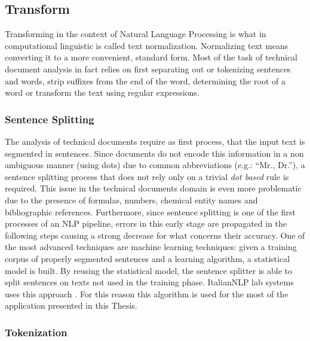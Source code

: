 \documentclass[]{book}
\begin{document}
\subsection{Transform}\label{sotatoolstransform}

Transforming in the context of Natural Language Processing is what in
computational linguistic is called text normalization. Normalizing text
means converting it to a more convenient, standard form. Most of the
task of technical document analysis in fact relies on first separating
out or tokenizing sentences and words, strip suffixes from the end of
the word, determining the root of a word or transform the text using
regular expressions.

\subsubsection{Sentence Splitting}\label{sentence-splitting}

The analysis of technical documents require as first process, that the
input text is segmented in sentences. Since documents do not encode this
information in a non ambiguous manner (using dots) due to common
abbreviations (e.g.: ``Mr., Dr.''), a sentence splitting process that
does not rely only on a trivial \emph{dot based} rule is required. This
issue in the technical documents domain is even more problematic due to
the presence of formulas, numbers, chemical entity names and
bibliographic references. Furthermore, since sentence splitting is one
of the first processes of an NLP pipeline, errors in this early stage
are propagated in the following steps causing a strong decrease for what
concerns their accuracy. One of the most advanced techniques are machine
learning techniques: given a training corpus of properly segmented
sentences and a learning algorithm, a statistical model is built. By
reusing the statistical model, the sentence splitter is able to split
sentences on texts not used in the training phase. ItalianNLP lab
systems uses this approach \citep[\citet{attardi2009reverse},
\citet{attardi2009accurate}]{dell2009ensemble}. For this reason this
algorithm is used for the most of the application presented in this
Thesis.

\subsubsection{Tokenization}\label{tokenization}
\end{document}
